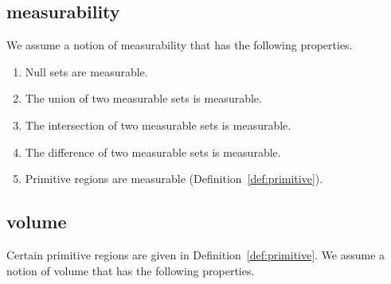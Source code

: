 \subsection{measurability}\label{sec:measure}

We assume a notion of measurability that has the following properties.

\begin{enumerate}%
 \item Null sets are measurable.\\
 \item The union of two measurable sets is measurable.\\
 \item The intersection of two measurable sets is measurable.\\
 \item The difference of two measurable sets is measurable.\\
 \item Primitive regions are measurable (Definition~\ref{def:primitive}).
\end{enumerate}

\subsection{volume}\label{sec:volume}

Certain primitive regions are given in Definition~\ref{def:primitive}.
We assume a notion of volume that has the following properties.

